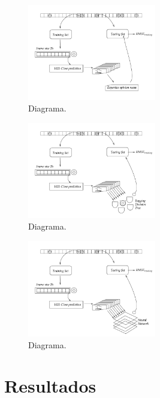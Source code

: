 \documentclass[a4paper,12pt,twocolumn]{article}
\begin{document}
\begin{figure}[!hbt]
\centering
\includegraphics[width=0.5\textwidth]{diagramExpertMean}
\caption{Diagrama.}
\label{diagramLinearRegression}
\end{figure}

\begin{figure}[!hbt]
\centering
\includegraphics[width=0.5\textwidth]{diagramBagging}
\caption{Diagrama.}
\label{diagramLinearRegression}
\end{figure}

\begin{figure}[!hbt]
\centering
\includegraphics[width=0.5\textwidth]{diagramNeuralNetwork}
\caption{Diagrama.}
\label{diagramLinearRegression}
\end{figure}



\section{Resultados}
\end{document}
